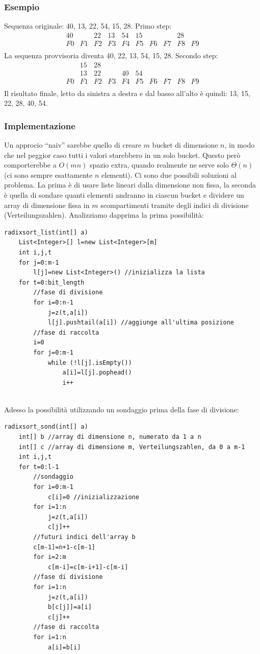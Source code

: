 \documentclass[a4paper]{book}
\newcommand{\lstIndent}{4}
\begin{document}
\subsubsection*{Esempio}
Sequenza originale: 40, 13, 22, 54, 15, 28. Primo step:    
\[\begin{array}{*{20}{c}}
{40}&{ }&{22}&{13}&{54}&{15}&{ }&{ }&{28}&{ }\\
{F0}&{F1}&{F2}&{F3}&{F4}&{F5}&{F6}&{F7}&{F8}&{F9}\\
\end{array}\]
La sequenza provvisoria diventa 40, 22, 13, 54, 15, 28. Secondo step:
\[\begin{array}{*{20}{c}}
{ }&{15}&{28}&{ }&{ }&{ }&{ }&{ }&{ }&{ }\\
{ }&{13}&{22}&{ }&{40}&{54}&{ }&{ }&{ }&{ }\\
{F0}&{F1}&{F2}&{F3}&{F4}&{F5}&{F6}&{F7}&{F8}&{F9}\\
\end{array}\]
Il risultato finale, letto da sinistra a destra e dal basso all'alto è quindi: 13, 15, 22, 28, 40, 54.
\subsubsection*{Implementazione}
Un approcio ``naiv'' sarebbe quello di creare $m$ bucket di dimensione $n$, in modo che nel peggior caso tutti i valori starebbero in un solo bucket. Questo però comporterebbe a $O(mn)$ spazio extra, quando realmente ne serve solo $\Theta (n)$ (ci sono sempre esattamente $n$ elementi). Ci sono due possibili soluzioni al problema. La prima è di usare liste lineari dalla dimensione non fissa, la seconda è quella di sondare quanti elementi andranno in ciascun bucket e dividere un array di dimensione fissa in $m$ scompartimenti tramite degli indici di divisione (Verteilungszahlen). Analizziamo dapprima la prima possibilità:
\begin{lstlisting}[tabsize=\lstIndent]
radixsort_list(int[] a)
	List<Integer>[] l=new List<Integer>[m]
	int i,j,t
	for j=0:m-1
		l[j]=new List<Integer>() //inizializza la lista
	for t=0:bit_length
		//fase di divisione
		for i=0:n-1
			j=z(t,a[i])
			l[j].pushtail(a[i]) //aggiunge all'ultima posizione
		//fase di raccolta
		i=0
		for j=0:m-1
			while (!l[j].isEmpty())
				a[i]=l[j].pophead()
				i++
				
\end{lstlisting}

\noindent Adesso la possibilità utilizzando un sondaggio prima della fase di divisione:
\begin{lstlisting}[tabsize=\lstIndent]
radixsort_sond(int[] a)
	int[] b //array di dimensione n, numerato da 1 a n
	int[] c //array di dimensione m, Verteilungszahlen, da 0 a m-1
	int i,j,t
	for t=0:l-1
		//sondaggio
		for i=0:m-1
			c[i]=0 //inizializzazione
		for i=1:n
			j=z(t,a[i])
			c[j]++ 
		//futuri indici dell'array b
		c[m-1]=n+1-c[m-1]
		for i=2:m
			c[m-i]=c[m-i+1]-c[m-i]
		//fase di divisione
		for i=1:n
			j=z(t,a[i])
			b[c[j]]=a[i]
			c[j]++
		//fase di raccolta
		for i=1:n
			a[i]=b[i]				
\end{lstlisting}
\end{document}
